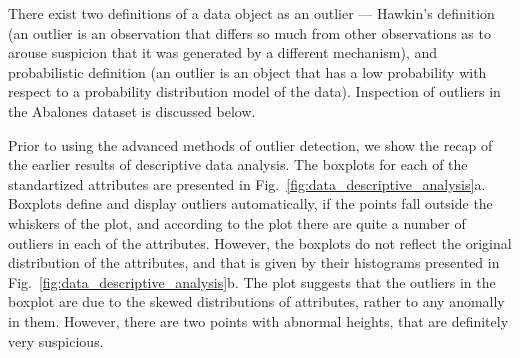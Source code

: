 \documentclass[10pt, paper=a4]{article}
\begin{document}
There exist two definitions of a data object as an outlier --- Hawkin's
definition (an outlier is an observation that differs so much from other
observations as to arouse suspicion that it was generated by a different
mechanism), and probabilistic definition (an outlier is an object that has a low
probability with respect to a probability distribution model of the data).
Inspection of outliers in the Abalones dataset is discussed below.

Prior to using the advanced methods of outlier detection, we show the recap of
the earlier results of descriptive data analysis.  The boxplots for each of the
standartized attributes are presented in
Fig.~\ref{fig:data_descriptive_analysis}a.  Boxplots define and display outliers
automatically, if the points fall outside the whiskers of the plot, and
according to the plot there are quite a number of outliers in each of the
attributes.  However, the boxplots do not reflect the original distribution of
the attributes, and that is given by their histograms presented in
Fig.~\ref{fig:data_descriptive_analysis}b.  The plot suggests that the outliers
in the boxplot are due to the skewed distributions of attributes, rather to any
anomally in them.  However, there are two points with abnormal heights, that are
definitely very suspicious.
\end{document}
